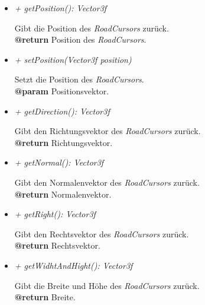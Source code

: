 \begin{itemize}
            \item  \textit{+ getPosition(): Vector3f}
                \begin{leftbar}[0.9\linewidth]
                    Gibt die Position des \textit{RoadCursors} zurück.\\
                    \textbf{@return} Position des \textit{RoadCursors}.
                \end{leftbar}

            \item  \textit{+ setPosition(Vector3f position)}
                \begin{leftbar}[0.9\linewidth]
                    Setzt die Position des \textit{RoadCursors}.\\
                    \textbf{@param} Positionsvektor.
                \end{leftbar}

            \pagebreak
            
            \item  \textit{+ getDirection(): Vector3f}
                \begin{leftbar}[0.9\linewidth]
                    Gibt den Richtungsvektor des \textit{RoadCursors} zurück.\\
                    \textbf{@return} Richtungsvektor.
                \end{leftbar}


            \item  \textit{+ getNormal(): Vector3f}
                \begin{leftbar}[0.9\linewidth]
                    Gibt den Normalenvektor des \textit{RoadCursors} zurück.\\
                    \textbf{@return} Normalenvektor.
                \end{leftbar}

            \item  \textit{+ getRight(): Vector3f}
                \begin{leftbar}[0.9\linewidth]
                    Gibt den Rechtsvektor des \textit{RoadCursors} zurück.\\
                    \textbf{@return} Rechtsvektor.
                \end{leftbar}

            \item  \textit{+ getWidhtAndHight(): Vector3f}
                \begin{leftbar}[0.9\linewidth]
                    Gibt die Breite und Höhe des \textit{RoadCursors} zurück.\\
                    \textbf{@return} Breite.
                \end{leftbar}


\end{itemize}
